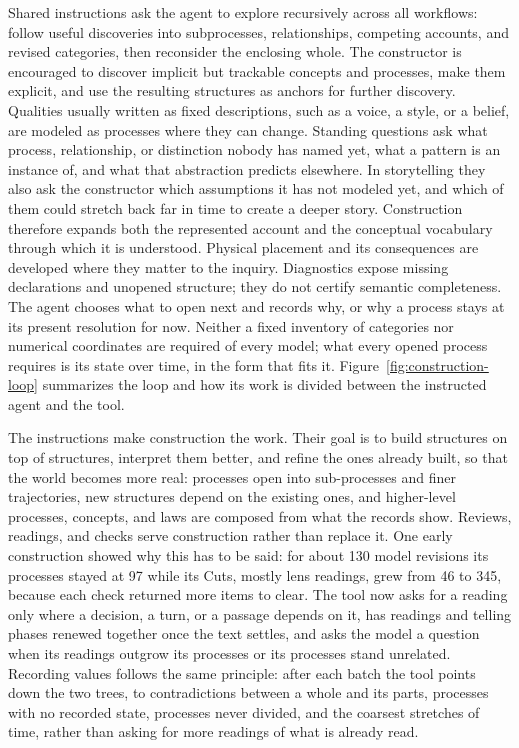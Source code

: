 \documentclass[11pt,a4paper]{article}
\begin{document}
Shared instructions ask the agent to explore recursively across all
workflows: follow useful discoveries into subprocesses, relationships,
competing accounts, and revised categories, then reconsider the enclosing
whole. The constructor is encouraged to discover implicit but trackable
concepts and processes, make them explicit, and use the resulting structures as
anchors for further discovery. Qualities usually written as fixed descriptions,
such as a voice, a style, or a belief, are modeled as processes where they can
change. Standing questions ask what process,
relationship, or distinction nobody has named yet, what a pattern is an
instance of, and what that abstraction predicts elsewhere. In storytelling they
also ask the constructor which assumptions it has not modeled yet, and which of
them could stretch back far in time to create a deeper story. Construction
therefore expands both the represented account and the conceptual vocabulary
through which it is understood. Physical placement and its consequences are developed where they matter
to the inquiry. Diagnostics expose missing declarations and unopened structure;
they do not certify semantic completeness. The agent chooses what to open next
and records why, or why a process stays at its present resolution for now.
Neither a fixed
inventory of categories nor numerical coordinates are required of every model;
what every opened process requires is its state over time, in the form that
fits it.
Figure~\ref{fig:construction-loop} summarizes the loop and how its work is
divided between the instructed agent and the tool.

The instructions make construction the work. Their goal is to build structures
on top of structures, interpret them better, and refine the ones already built,
so that the world becomes more real: processes open into sub-processes and finer
trajectories, new structures depend on the existing ones, and higher-level
processes, concepts, and laws are composed from what the records show. Reviews,
readings, and checks serve construction rather than replace it. One early
construction showed why this has to be said: for about 130 model revisions its
processes stayed at 97 while its Cuts, mostly lens readings, grew from 46 to 345,
because each check returned more items to clear. The tool now asks for a reading
only where a decision, a turn, or a passage depends on it, has readings and
telling phases renewed together once the text settles, and asks the model a
question when its readings outgrow its processes or its processes stand
unrelated. Recording values follows the same principle: after each batch the
tool points down the two trees, to contradictions between a whole and its parts,
processes with no recorded state, processes never divided, and the coarsest
stretches of time, rather than asking for more readings of what is already
read.
\end{document}
